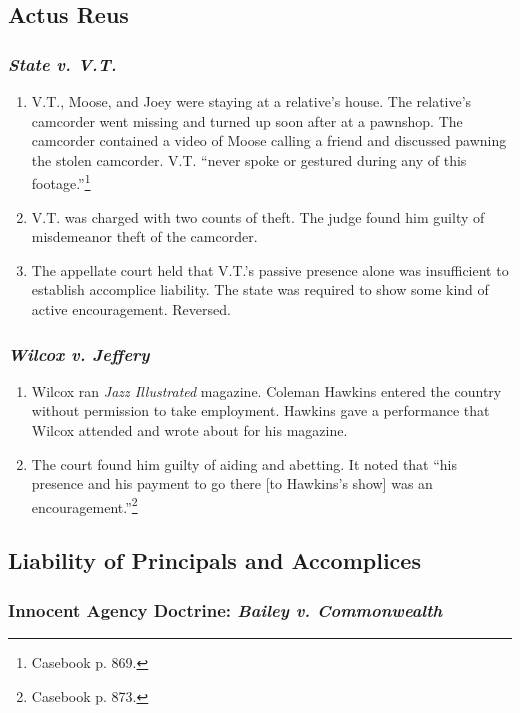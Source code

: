 \subsection{Actus Reus}

\subsubsection{\emph{State v. V.T.}}

\begin{enumerate}
    \item V.T., Moose, and Joey were staying at a relative's house. The 
    relative's camcorder went missing and turned up soon after at a pawnshop. 
    The camcorder contained a video of Moose calling a friend and discussed 
    pawning the stolen camcorder. V.T. ``never spoke or gestured during any of 
    this footage.''\footnote{Casebook p. 869.}
    \item V.T. was charged with two counts of theft. The judge found him 
    guilty of misdemeanor theft of the camcorder.
    \item The appellate court held that V.T.'s passive presence alone was insufficient 
    to establish accomplice liability. The state was required to show some 
    kind of active encouragement. Reversed.
\end{enumerate}

\subsubsection{\emph{Wilcox v. Jeffery}}

\begin{enumerate}
    \item Wilcox ran \emph{Jazz Illustrated} magazine. Coleman Hawkins entered 
    the country without permission to take employment. Hawkins gave a 
    performance that Wilcox attended and wrote about for his magazine.
    \item The court found him guilty of aiding and abetting. It noted that 
    ``his presence and his payment to go there [to Hawkins's show] was an 
    encouragement.''\footnote{Casebook p. 873.}
\end{enumerate}

\subsection{Liability of Principals and Accomplices}

\subsubsection{Innocent Agency Doctrine: \emph{Bailey v. Commonwealth}}

